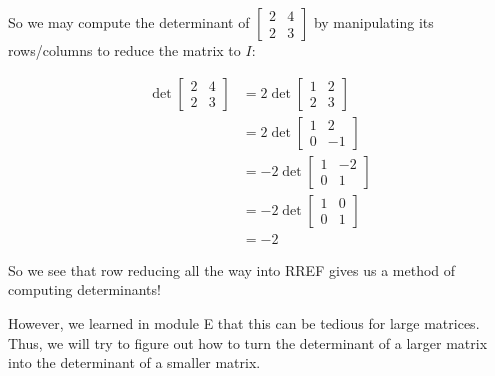 \begin{observation}
  So we may compute the determinant of \(\begin{bmatrix} 2 & 4 \\ 2 & 3 \end{bmatrix}\) 
  by manipulating its rows/columns to reduce the matrix to \(I\):

  \begin{align*}
    \det\begin{bmatrix} 2 & 4 \\ 2 & 3 \end{bmatrix}
      &=
    2 \det \begin{bmatrix} 1 & 2 \\ 2 & 3 \end{bmatrix}\\
      &=
    2 \det \begin{bmatrix} 1 & 2 \\ 0 & -1 \end{bmatrix}\\
      &=
    -2 \det \begin{bmatrix} 1 & -2 \\ 0 & 1 \end{bmatrix}\\
      &=
    -2 \det \begin{bmatrix} 1 & 0 \\ 0 & 1 \end{bmatrix}\\
      &=
	-2
  \end{align*}
\end{observation}

\begin{remark}
So we see that row reducing all the way into RREF gives us a method of computing determinants!

\vspace{1em}

However, we learned in module E that this can be tedious for large matrices.  Thus, we will try
to figure out how to turn the determinant of a larger matrix
into the determinant of a smaller matrix.
\end{remark}



